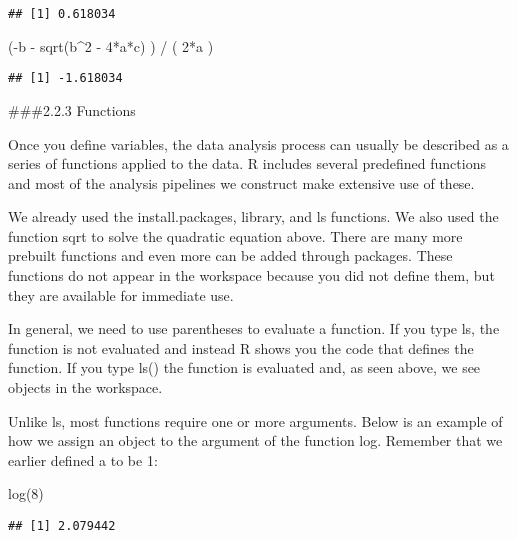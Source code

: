 \documentclass[
]{article}
\newenvironment{Shaded}{\begin{snugshade}}{\end{snugshade}}
\newcommand{\DecValTok}[1]{\textcolor[rgb]{0.00,0.00,0.81}{#1}}
\newcommand{\FunctionTok}[1]{\textcolor[rgb]{0.00,0.00,0.00}{#1}}
\newcommand{\NormalTok}[1]{#1}
\newcommand{\SpecialCharTok}[1]{\textcolor[rgb]{0.00,0.00,0.00}{#1}}
\begin{document}
\begin{verbatim}
## [1] 0.618034
\end{verbatim}

\begin{Shaded}
\begin{Highlighting}[]
\NormalTok{(}\SpecialCharTok{{-}}\NormalTok{b }\SpecialCharTok{{-}} \FunctionTok{sqrt}\NormalTok{(b}\SpecialCharTok{\^{}}\DecValTok{2} \SpecialCharTok{{-}} \DecValTok{4}\SpecialCharTok{*}\NormalTok{a}\SpecialCharTok{*}\NormalTok{c) ) }\SpecialCharTok{/}\NormalTok{ ( }\DecValTok{2}\SpecialCharTok{*}\NormalTok{a )}
\end{Highlighting}
\end{Shaded}

\begin{verbatim}
## [1] -1.618034
\end{verbatim}

\#\#\#2.2.3 Functions

Once you define variables, the data analysis process can usually be
described as a series of functions applied to the data. R includes
several predefined functions and most of the analysis pipelines we
construct make extensive use of these.

We already used the install.packages, library, and ls functions. We also
used the function sqrt to solve the quadratic equation above. There are
many more prebuilt functions and even more can be added through
packages. These functions do not appear in the workspace because you did
not define them, but they are available for immediate use.

In general, we need to use parentheses to evaluate a function. If you
type ls, the function is not evaluated and instead R shows you the code
that defines the function. If you type ls() the function is evaluated
and, as seen above, we see objects in the workspace.

Unlike ls, most functions require one or more arguments. Below is an
example of how we assign an object to the argument of the function log.
Remember that we earlier defined a to be 1:

\begin{Shaded}
\begin{Highlighting}[]
\FunctionTok{log}\NormalTok{(}\DecValTok{8}\NormalTok{)}
\end{Highlighting}
\end{Shaded}

\begin{verbatim}
## [1] 2.079442
\end{verbatim}
\end{document}
